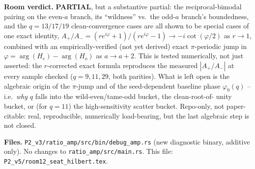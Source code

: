 \textbf{Room verdict.} \textbf{PARTIAL}, but a substantive partial: the reciprocal-bimodal
pairing on the even-$a$ branch, its ``wildness'' vs.\ the odd-$a$ branch's boundedness, and the
$q=13/17/19$ clean-convergence cases are all shown to be special cases of one exact identity,
$A_+/A_- = (re^{i\varphi}+1)/(re^{i\varphi}-1) \to -i\cot(\varphi/2)$ as $r\to1$, combined with an
empirically-verified (not yet derived) exact $\pi$-periodic jump in $\varphi=\arg(H_e)-\arg(H_o)$
as $a\to a+2$. This is tested numerically, not just asserted: the $r$-corrected exact formula
reproduces the measured $|A_+/A_-|$ at every sample checked ($q=9,11,29$, both parities). What is
left open is the algebraic origin of the $\pi$-jump and of the seed-dependent baseline phase
$\varphi_0(q)$ -- i.e.\ \emph{why} $q$ falls into the wild-even/tame-odd bucket, the clean-root-of-
unity bucket, or (for $q=11$) the high-sensitivity scatter bucket. Repo-only, not paper-citable:
real, reproducible, numerically load-bearing, but the last algebraic step is not closed.

\textbf{Files.} \texttt{P2\_v3/ratio\_amp/src/bin/debug\_amp.rs} (new diagnostic binary, additive
only). No changes to \texttt{ratio\_amp/src/main.rs}. This file:
\texttt{P2\_v5/room12\_seat\_hilbert.tex}.
